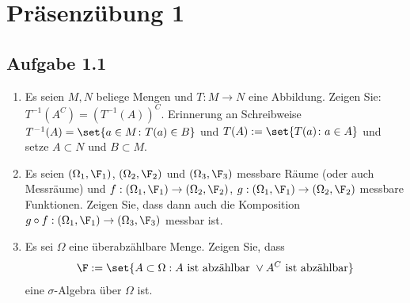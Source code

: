 
\section{Präsenzübung 1}
\subsection{Aufgabe 1.1}

\begin{enumerate}[label=\alph*)]
	\item Es seien $M,N$ beliege Mengen und $T: M \to N$ eine Abbildung. Zeigen Sie: $T^{-1}(A^C) = (T^{-1}(A))^C$.
	Erinnerung an Schreibweise $T^{-1}(A) = \set{a \in M \colon T(a) \in B}$ und $T(A) := \set{T(a) \colon a \in A}$ und setze $A \subset N$ und $B \subset M$.
	\item Es seien $(\Omega_1, \F_1)$, $(\Omega_2, \F_2)$ und $(\Omega_3, \F_3)$ messbare Räume (oder auch Messräume) und $f: (\Omega_1, \F_1) \to (\Omega_2, \F_2)$, $g: (\Omega_1, \F_1) \to (\Omega_2, \F_2)$ messbare Funktionen. Zeigen Sie, dass dann auch die Komposition $g\circ f: (\Omega_1, \F_1) \to (\Omega_3, \F_3)$ messbar ist.
	\item Es sei $\Omega$ eine überabzählbare Menge. Zeigen Sie, dass
	\begin{align*}
		\F := \set{A \subset \Omega: A \text{ ist abzählbar } \vee A^{C} \text{ ist abzählbar}}
	\end{align*}
	eine $\sigma$-Algebra über $\Omega$ ist.
\end{enumerate}
